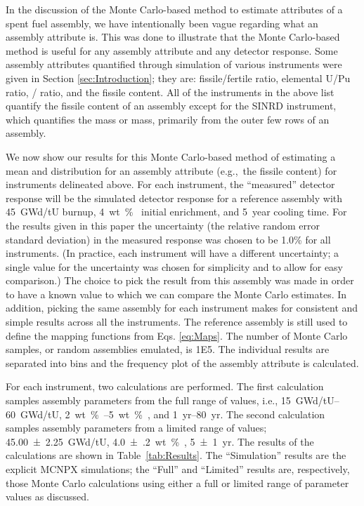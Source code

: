 \documentclass{ansnse}
\begin{document}
In the discussion of the Monte Carlo-based method to estimate attributes of a spent fuel assembly, we have intentionally been vague regarding what an assembly attribute is.  This was done to illustrate that the Monte Carlo-based method is useful for any assembly attribute and any detector response.  Some assembly attributes quantified through simulation of various instruments were given in Section \ref{sec:Introduction}; they are: fissile/fertile ratio, elemental U/Pu ratio, / ratio, and the fissile content.  All of the instruments in the above list quantify the fissile content of an assembly except for the SINRD instrument, which quantifies the  mass or  mass, primarily from the outer few rows of an assembly.

We now show our results for this Monte Carlo-based method of estimating a mean and distribution for an assembly attribute (e.g.,\ the fissile content) for instruments delineated above.  For each instrument, the ``measured'' detector response will be the simulated detector response for a reference assembly with \SI{45}{GWd/tU} burnup, \SI{4}{wt \% } initial enrichment, and \SI{5}{year} cooling time.  For the results given in this paper the uncertainty (the relative random error standard deviation) in the measured response was chosen to be 1.0\% for all instruments.  (In practice, each instrument will have a different uncertainty; a single value for the uncertainty was chosen for simplicity and to allow for easy comparison.)  The choice to pick the result from this assembly was made in order to have a known value to which we can compare the Monte Carlo estimates.  In addition, picking the same assembly for each instrument makes for consistent and simple results across all the instruments.  The reference assembly is still used to define the mapping functions from Eqs. \eqref{eq:Maps}.  The number of Monte Carlo samples, or random assemblies emulated, is \num{1E5}.  The individual results are separated into bins and the frequency plot of the assembly attribute is calculated.

For each instrument, two calculations are performed.  The first calculation samples assembly parameters from the full range of values, i.e., \SIrange{15}{60}{GWd/tU}, \SIrange{2}{5}{wt \% }, and \SIrange{1}{80}{yr}.  The second calculation samples assembly parameters from a limited range of values; \SI{45.00(225)}{GWd/tU}, \SI{4.0(2)}{wt \% }, \SI{5(1)}{yr}.  The results of the calculations are shown in Table~\ref{tab:Results}.  The ``Simulation'' results are the explicit MCNPX simulations; the ``Full'' and ``Limited'' results are, respectively, those Monte Carlo calculations using either a full or limited range of parameter values as discussed.
\end{document}
